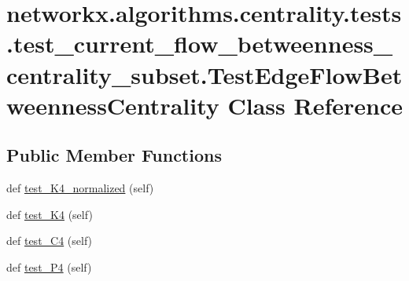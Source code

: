 \hypertarget{classnetworkx_1_1algorithms_1_1centrality_1_1tests_1_1test__current__flow__betweenness__centraliab4e733e7ce761709e531cfb6e08ef7a}{}\section{networkx.\+algorithms.\+centrality.\+tests.\+test\+\_\+current\+\_\+flow\+\_\+betweenness\+\_\+centrality\+\_\+subset.\+Test\+Edge\+Flow\+Betweenness\+Centrality Class Reference}
\label{classnetworkx_1_1algorithms_1_1centrality_1_1tests_1_1test__current__flow__betweenness__centraliab4e733e7ce761709e531cfb6e08ef7a}
\subsection*{Public Member Functions}
\begin{DoxyCompactItemize}
\item 
def \hyperlink{classnetworkx_1_1algorithms_1_1centrality_1_1tests_1_1test__current__flow__betweenness__centraliab4e733e7ce761709e531cfb6e08ef7a_a34817c4460e34d41e684eff160f07c64}{test\+\_\+\+K4\+\_\+normalized} (self)
\item 
def \hyperlink{classnetworkx_1_1algorithms_1_1centrality_1_1tests_1_1test__current__flow__betweenness__centraliab4e733e7ce761709e531cfb6e08ef7a_ae3d5048db06fff3092e86e441bc7ccf6}{test\+\_\+\+K4} (self)
\item 
def \hyperlink{classnetworkx_1_1algorithms_1_1centrality_1_1tests_1_1test__current__flow__betweenness__centraliab4e733e7ce761709e531cfb6e08ef7a_a3cfd56f3e1a7586a2013a56b34c8aa84}{test\+\_\+\+C4} (self)
\item 
def \hyperlink{classnetworkx_1_1algorithms_1_1centrality_1_1tests_1_1test__current__flow__betweenness__centraliab4e733e7ce761709e531cfb6e08ef7a_add292ac23be90a48cbcdfb72daa10dd2}{test\+\_\+\+P4} (self)
\end{DoxyCompactItemize}


